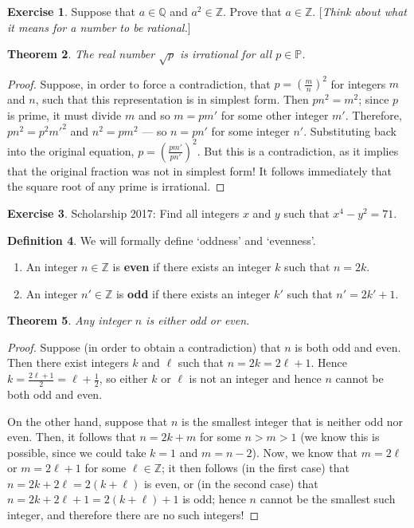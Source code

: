 \documentclass[a4paper]{amsart}
\newtheorem{thm}{Theorem}[section]
\theoremstyle{definition}
\newtheorem{defn}[thm]{Definition}
\newtheorem{exercise}[thm]{Exercise}
\theoremstyle{remark}
\begin{document}
\begin{exercise}
  Suppose that $ a \in \mathbb{Q} $ and $ a^2 \in \mathbb{Z} $. Prove that $ a \in \mathbb{Z} $. [\emph{Think about what it means for a number to be rational.}]
\end{exercise}

\begin{thm}\label{thm:irrational}
  The real number $ \sqrt{p} $ is irrational for all $ p \in \mathbb{P} $.
\end{thm}
\begin{proof}
  Suppose, in order to force a contradiction, that $ p = \left(\frac{m}{n}\right)^2 $ for integers $ m $ and $ n $, such
  that this representation is in simplest form. Then $ pn^2 = m^2 $; since $ p $ is prime, it must divide $ m $ and
  so $ m = pm' $ for some other integer $ m' $. Therefore, $ pn^2 = p^2 m'^2 $ and $ n^2 = pm^2 $ --- so $ n = pn' $ for
  some integer $ n' $. Substituting back into the original equation, $ p = \left(\frac{pm'}{pn'}\right)^2 $. But this
  is a contradiction, as it implies that the original fraction was not in simplest form! It follows immediately that the
  square root of any prime is irrational.
\end{proof}

\begin{exercise}
  Scholarship 2017: Find all integers $ x $ and $ y $ such that $ x^4 - y^2 = 71 $.
\end{exercise}

\begin{defn}
  We will formally define `oddness' and `evenness'.
  \begin{enumerate}
    \item An integer $ n \in \mathbb{Z} $ is \textbf{even} if there exists an integer $ k $ such that $ n = 2k $.
    \item An integer $ n' \in \mathbb{Z} $ is \textbf{odd} if there exists an integer $ k' $ such that $ n' = 2k' + 1 $.
  \end{enumerate}
\end{defn}

\begin{thm}
  Any integer $ n $ is either odd or even.
\end{thm}
\begin{proof}
  Suppose (in order to obtain a contradiction) that $ n $ is both odd and even. Then there exist integers $ k $ and $ \ell $ such that $ n = 2k = 2\ell + 1 $.
  Hence $ k = \frac{2\ell + 1}{2} = \ell + \frac{1}{2} $, so either $ k $ or $ \ell $ is not an integer and hence $ n $ cannot be both odd and even.

  On the other hand, suppose that $ n $ is the smallest integer that is neither odd nor even. Then, it follows that $ n = 2k + m $ for some $ n > m > 1 $
  (we know this is possible, since we could take $ k = 1 $ and $ m = n - 2 $). Now, we know that $ m = 2\ell $ or $ m = 2\ell + 1 $ for some $ \ell \in \mathbb{Z} $;
  it then follows (in the first case) that $ n = 2k + 2\ell = 2(k + \ell) $ is even, or (in the second case) that $ n = 2k + 2\ell + 1 = 2(k + \ell) + 1 $ is
  odd; hence $ n $ cannot be the smallest such integer, and therefore there are no such integers!
\end{proof}
\end{document}
